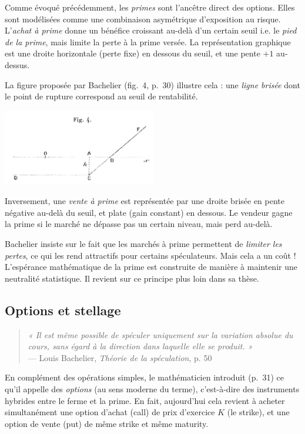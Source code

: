 \documentclass[12pt,a4paper]{article}
\begin{document}
Comme évoqué précédemment, les \textit{primes} sont l’ancêtre direct des options. Elles sont modélisées comme une combinaison asymétrique d’exposition au risque. L’\textit{achat à prime} donne un bénéfice croissant au-delà d’un certain seuil i.e. le \textit{pied de la prime}, mais limite la perte à la prime versée. La représentation graphique est une droite horizontale (perte fixe) en dessous du seuil, et une pente $+1$ au-dessus.

La figure proposée par Bachelier (fig.~4, p.~30) illustre cela : une \textit{ligne brisée} dont le point de rupture correspond au seuil de rentabilité.

\begin{center}
  \includegraphics[width=0.5\textwidth]{fig4.png}
\end{center}

Inversement, une \textit{vente à prime} est représentée par une droite brisée en pente négative au-delà du seuil, et plate (gain constant) en dessous. Le vendeur gagne la prime si le marché ne dépasse pas un certain niveau, mais perd au-delà.

Bachelier insiste sur le fait que les marchés à prime permettent de \textit{limiter les pertes}, ce qui les rend attractifs pour certains spéculateurs. Mais cela a un coût ! L'espérance mathématique de la prime est construite de manière à maintenir une neutralité statistique. Il revient sur ce principe plus loin dans sa thèse.

\subsection{Options et stellage}

\begin{quote}
    \emph{« Il est même possible de spéculer uniquement sur la variation absolue du cours, sans égard à la direction dans laquelle elle se produit. »} \\
    — Louis Bachelier, \emph{Théorie de la spéculation}, p. 50
\end{quote}

En complément des opérations simples, le mathématicien introduit (p.~31) ce qu’il appelle des \textit{options} (au sens moderne du terme), c’est-à-dire des instruments hybrides entre le ferme et la prime. En fait, aujourd'hui cela revient à acheter simultanément une option d'achat (call) de prix d'exercice $K$ (le strike), et une option de vente (put) de même strike et même maturity.
\end{document}
